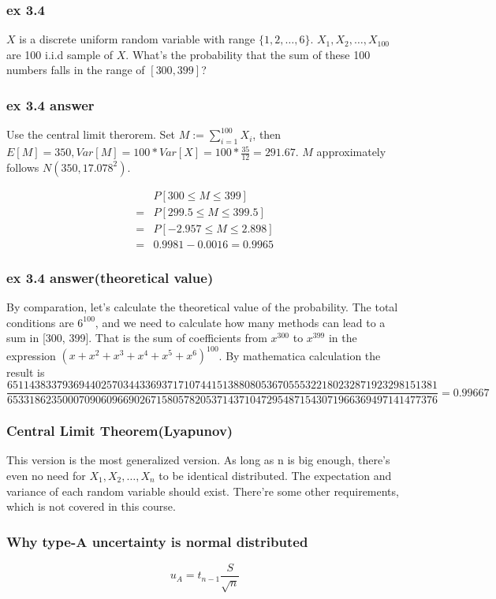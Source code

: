 \documentclass{beamer}
\begin{document}
\begin{frame}
    \frametitle{ex 3.4}
    $X$ is a discrete uniform random variable with range $\{1,2,\dots, 6\}$. $X_1, X_2, \dots , X_{100}$ are 100 i.i.d sample of $X$. What's the probability that the sum of these 100 numbers falls in the range of $[300, 399]$?

\end{frame}

\begin{frame}
    \frametitle{ex 3.4 answer}
    Use the central limit therorem. Set $M:=\sum\limits_{i=1}^{100}X_i$, then $E[M]=350, Var[M]=100*Var[X]=100*\frac{35}{12}=291.67$. $M$ approximately follows $N(350, 17.078^2)$. \par
    \begin{align*}
        & P[300\leq M\leq 399]\\
        = & P[299.5\leq M \leq 399.5]\\
        = & P[-2.957\leq M \leq 2.898]\\
        = & 0.9981-0.0016=0.9965
    \end{align*}


\end{frame}

\begin{frame}
    \frametitle{ex 3.4 answer(theoretical value)}
    By comparation, let's calculate the theoretical value of the probability. The total conditions are $6^{100}$, and we need to calculate how many methods can lead to a sum in [300, 399]. That is the sum of coefficients from $x^{300}$ to $x^{399}$ in the expression $(x+x^2+x^3+x^4+x^5+x^6)^{100}$. By mathematica calculation the result is
    \tiny
    \[\frac{6511438337936944025703443369371710744151388080536705553221802328719232
    98151381}{6533186235000709060966902671580578205371437104729548715430719663694971
    41477376}=0.99667\]
    

\end{frame}

\begin{frame}
    \frametitle{Central Limit Theorem(Lyapunov)}
    This version is the most generalized version. As long as n is big enough, there's even no need for $X_1, X_2, \dots , X_n$ to be identical distributed. The expectation and variance of each random variable should exist. There're some other requirements, which is not covered in this course.
    

\end{frame}

\begin{frame}
    \frametitle{Why type-A uncertainty is normal distributed}
    \[u_{A}=t_{n-1}\frac{S}{\sqrt{n}}\]

\end{frame}
\end{document}
